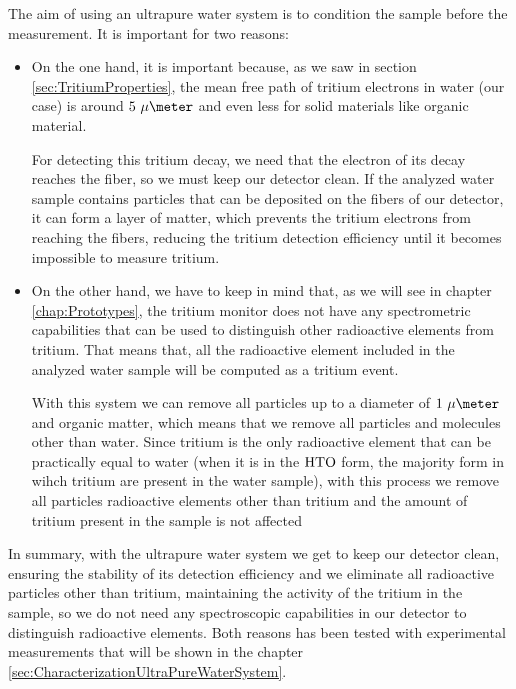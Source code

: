 The aim of using an ultrapure water system is to condition the sample before the measurement. It is important for two reasons:

\begin{itemize}

\item{} On the one hand, it is important because, as we saw in section \ref{sec:TritiumProperties}, the mean free path of tritium electrons in water (our case) is around $5~\mu\meter$ and even less for solid materials like organic material.

For detecting this tritium decay, we need that the electron of its decay reaches the fiber, so we must keep our detector clean. If the analyzed water sample contains particles that can be deposited on the fibers of our detector, it can form a layer of matter, which prevents the tritium electrons from reaching the fibers, reducing the tritium detection efficiency until it becomes impossible to measure tritium.

\item{} On the other hand, we have to keep in mind that, as we will see in chapter \ref{chap:Prototypes}, the tritium monitor does not have any spectrometric capabilities that can be used to distinguish other radioactive elements from tritium. That means that, all the radioactive element included in the analyzed water sample will be computed as a tritium event.

With this system we can remove all particles up to a diameter of $1~\mu\meter$ and organic matter, which means that we remove all particles and molecules other than water. Since tritium is the only radioactive element that can be practically equal to water (when it is in the $\ce{HTO}$ form, the majority form in wihch tritium are present in the water sample), with this process we remove all particles radioactive elements other than tritium and the amount of tritium present in the sample is not affected

\end{itemize} 

In summary, with the ultrapure water system we get to keep our detector clean, ensuring the stability of its detection efficiency and we eliminate all radioactive particles other than tritium, maintaining the activity of the tritium in the sample, so we do not need any spectroscopic capabilities in our detector to distinguish radioactive elements. Both reasons has been tested with experimental measurements that will be shown in the chapter \ref{sec:CharacterizationUltraPureWaterSystem}.